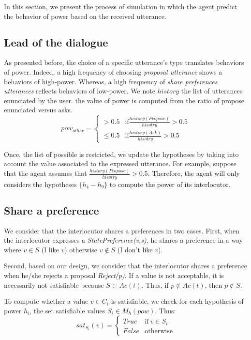 \documentclass[conference, letterpaper]{IEEEtran}
\begin{document}
	In this section, we present the process of simulation in which the agent predict the behavior of power based on the received utterance. 
		
		\subsection{Lead of the dialogue}		
		As presented before, the choice of a specific utterance's type translates behaviors of power. Indeed, a high frequency of choosing \emph{proposal utterance} shows a behaviors of high-power. Whereas, a high frequency of \emph{share preferences utterances} reflects behaviors of low-power.
		We note $history$ the list of utterances enunciated by the user. the value of power is computed from the ratio of propose enunciated versus asks.
		\begin{equation}
		pow_{other} = \left\{\begin{array}{ll}
		> 0.5 & \mathrm{if } \frac{history(Propose)}{hisotry} > 0.5\\
		\leq 0.5 & \mathrm{if  } \frac{history(Ask)}{hisotry} > 0.5
		\end{array}\right.
		\end{equation}
		
		Once, the list of possible is restricted, we update the hypotheses by taking into account the value associated to the expressed utterance.
		For example, suppose that the agent assumes that $\frac{history(Propose)}{hisotry} > 0.5$. Therefore, the agent will only considers the hypotheses $\{h_4 - h_9\}$ to compute the power of its interlocutor.
		
	\subsection{Share a preference}
		We consider that the interlocutor shares a preferences in two cases.
		First, when the interlocutor expresses a \emph{StatePreference(v,s)}, he shares a preference in a way where $v \in S$ (I like $v$) otherwise $v \notin S$ (I don't like $v$). 
		
		Second, based on our design, we consider that the interlocutor shares a preference when he/she rejects a proposal \emph{Reject(p)}. If a value is not acceptable, it is necessarily not satisfiable because $S \subset Ac(t)$. Thus, if $p\not\in Ac(t)$, then $p\not\in S$. 
		
		To compute whether a value $v \in C_i$ is satisfiable, we check for each hypothesis of power $h_i$, the set satisfiable values $S_i \in M_h(pow)$.
		Thus: 
			\begin{equation}
			sat_{S_i}(v)= \left\{\begin{array}{ll}
			True	 & \mathrm{if\ }  v \in S_i\\
			False & \mathrm{otherwise}
			\end{array}\right.
			\end{equation}
			
\end{document}
